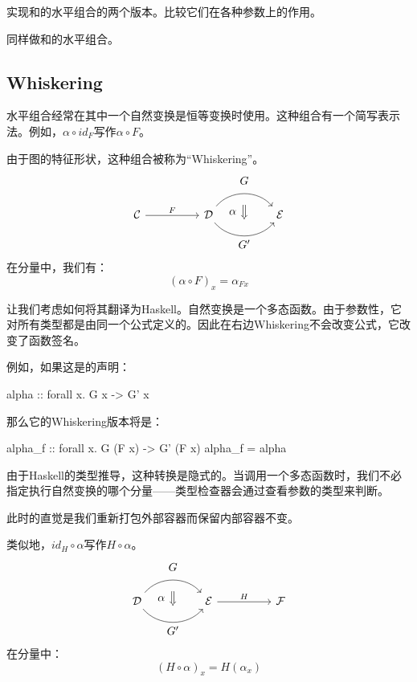 \documentclass[DaoFP]{subfiles}
\begin{document}
    \begin{exercise}
        实现和的水平组合的两个版本。比较它们在各种参数上的作用。
    \end{exercise}

    \begin{exercise}
        同样做和的水平组合。
    \end{exercise}

    \subsection{Whiskering}

    水平组合经常在其中一个自然变换是恒等变换时使用。这种组合有一个简写表示法。例如，$\alpha \circ id_F$写作$\alpha \circ F$。

    由于图的特征形状，这种组合被称为“Whiskering”。
    \[
        \begin{tikzcd}[column sep=huge]
            \mathcal{C}
            \arrow[r, "F"]
            &
            \mathcal{D}
            \arrow[bend left=50]{r}[name=U1, label=above:$G$]{}
            \arrow[bend right=50]{r}[name=D1, label=below:$G'$]{}
            &
            \mathcal{E}
            \arrow[shorten <=10pt,shorten >=10pt,Rightarrow,to path={(U1) -- node[label=left:$\alpha$] {} (D1)}]{}
        \end{tikzcd}
    \]
    在分量中，我们有：
    \[ (\alpha \circ F)_x = \alpha_{F x} \]

    让我们考虑如何将其翻译为Haskell。自然变换是一个多态函数。由于参数性，它对所有类型都是由同一个公式定义的。因此在右边Whiskering不会改变公式，它改变了函数签名。

    例如，如果这是的声明：
    \begin{haskell}
        alpha :: forall x. G x -> G' x
    \end{haskell}
    那么它的Whiskering版本将是：
    \begin{haskell}
        alpha_f :: forall x. G (F x) -> G' (F x)
        alpha_f = alpha
    \end{haskell}
    由于Haskell的类型推导，这种转换是隐式的。当调用一个多态函数时，我们不必指定执行自然变换的哪个分量——类型检查器会通过查看参数的类型来判断。

    此时的直觉是我们重新打包外部容器而保留内部容器不变。

    类似地，$id_H \circ \alpha$写作$H \circ \alpha$。
    \[
        \begin{tikzcd}[column sep=huge]
            \mathcal{D}
            \arrow[bend left=50]{r}[name=U, label=above:$G$]{}
            \arrow[bend right=50]{r}[name=D, label=below:$G'$]{}
            &
            \mathcal{E}
            \arrow[r, "H"]
            &
            \mathcal{F}
            \arrow[shorten <=10pt,shorten >=10pt,Rightarrow,to path={(U) -- node[label=left:$\alpha$] {} (D)}]{}
        \end{tikzcd}
    \]
    在分量中：
    \[(H \circ \alpha)_x = H (\alpha_x) \]
\end{document}
